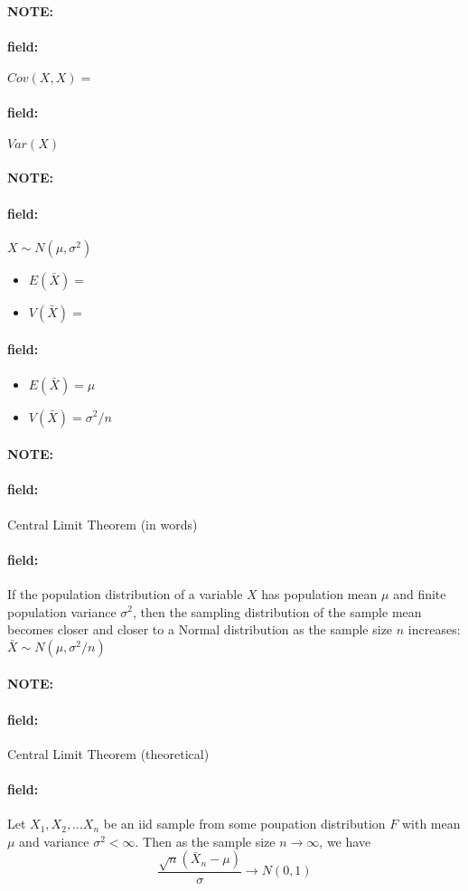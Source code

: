 \documentclass[12pt]{article}
\newenvironment{note}{\paragraph{NOTE:}}{}
\newenvironment{field}{\paragraph{field:}}{}
\begin{document}
\begin{note}
    \begin{field}
        $Cov(X,X) =$
    \end{field}
    \begin{field}
        $Var(X)$
    \end{field}
\end{note}

\begin{note}
    \begin{field}
        $X \sim N(\mu,\sigma^2)$
            \begin{itemize}
              \item $E(\bar{X}) = $
              \item $V(\bar{X}) = $
            \end{itemize}
    \end{field}
    \begin{field}
        \begin{itemize}
              \item $E(\bar{X}) = \mu$
              \item $V(\bar{X}) = \sigma^2/n$
            \end{itemize}
    \end{field}
\end{note}

\begin{note}
    \begin{field}
        Central Limit Theorem (in words)
    \end{field}
    \begin{field}
        If the population distribution of a variable $X$ has population mean $\mu$ and finite population variance $\sigma^2$, then the sampling distribution of the sample mean becomes closer and closer to a Normal distribution as the sample size $n$ increases: $\bar{X} \sim N(\mu,\sigma^2/n)$
    \end{field}
\end{note}

\begin{note}
    \begin{field}
        Central Limit Theorem (theoretical)
    \end{field}
    \begin{field}
        Let $X_1, X_2, \ldots X_n$ be an iid sample from some poupation distribution $F$ with mean $\mu$ and variance $\sigma^2 < \infty$. Then as the sample size $n \to \infty$, we have $$\frac{\sqrt{n}(\bar{X}_n - \mu)}{\sigma} \to N(0,1)$$
    \end{field}
\end{note}
\end{document}

